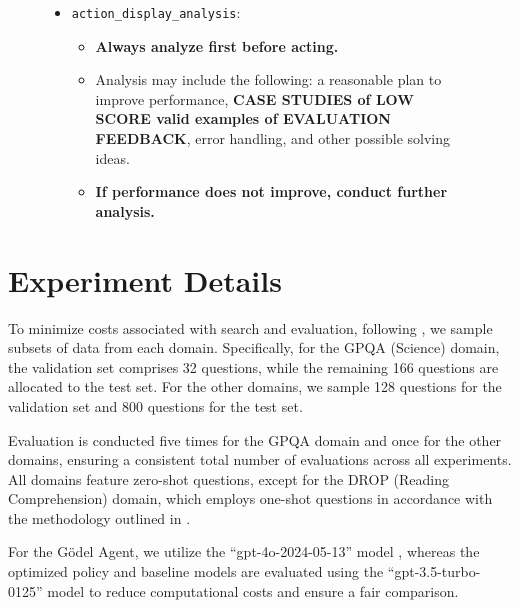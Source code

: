 \documentclass[11pt]{article}
\newcommand{\framework}{Gödel Agent\xspace}
\begin{document}
\begin{figure}[ht]
\begin{tcolorbox}[colback=black!15!white, colframe=black, title=Goal Prompt of \framework]
\begin{itemize}[leftmargin=*,itemsep=1pt]
\begin{itemize}[leftmargin=*,itemsep=1pt]
        \item Explore techniques like: LLM Debate, Step-back Abstraction, Dynamic Assignment of Roles, and so on.
    \end{itemize}
    \item \texttt{action\_display\_analysis}:
    \begin{itemize}
        \item \textbf{Always analyze first before acting.}
        \item Analysis may include the following: a reasonable plan to improve performance, \textbf{CASE STUDIES of LOW SCORE valid examples of EVALUATION FEEDBACK}, error handling, and other possible solving ideas.
        \item \textbf{If performance does not improve, conduct further analysis.}
    \end{itemize}
\end{itemize}

\end{tcolorbox}
\end{figure}



\section{Experiment Details}

\label{sec:expdetails}
To minimize costs associated with search and evaluation, following \citep{hu2024automated}, we sample subsets of data from each domain. Specifically, for the GPQA (Science) domain, the validation set comprises 32 questions, while the remaining 166 questions are allocated to the test set. For the other domains, we sample 128 questions for the validation set and 800 questions for the test set.

Evaluation is conducted five times for the GPQA domain and once for the other domains, ensuring a consistent total number of evaluations across all experiments. All domains feature zero-shot questions, except for the DROP (Reading Comprehension) domain, which employs one-shot questions in accordance with the methodology outlined in \citet{openai2023simpleevals}.

For the \framework, we utilize the “gpt-4o-2024-05-13” model \citep{openai2024gpt4technicalreport}, whereas the optimized policy and baseline models are evaluated using the “gpt-3.5-turbo-0125” model \citep{openai2022chatgpt} to reduce computational costs and ensure a fair comparison.
\end{document}
